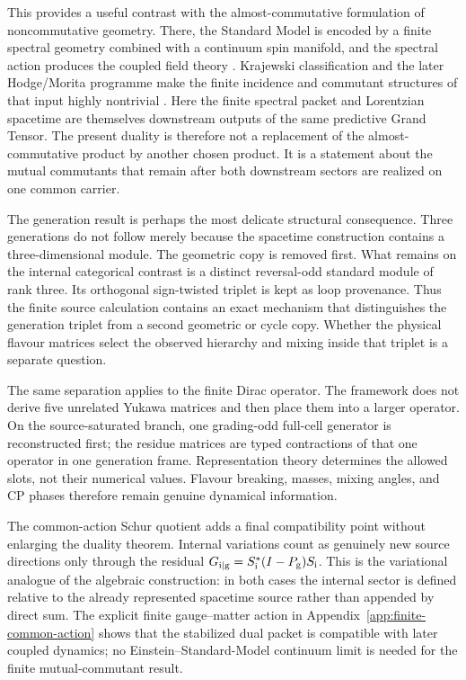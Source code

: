 \documentclass[11pt]{article}
\theoremstyle{definition}
\theoremstyle{remark}
\begin{document}
This provides a useful contrast with the almost-commutative formulation of
noncommutative geometry.  There, the Standard Model is encoded by a finite
spectral geometry combined with a continuum spin manifold, and the spectral
action produces the coupled field theory
\cite{ConnesGravityMatter1996,ChamseddineConnes1997,
ChamseddineConnesMarcolli2007,ChamseddineConnes2008,
vanDenDungenVanSuijlekom2012}.  Krajewski classification and the later
Hodge/Morita programme make the finite incidence and commutant structures of
that input highly nontrivial \cite{Krajewski1998,DAndreaDabrowski2016,
DabrowskiDAndreaSitarz2018}.  Here the finite spectral packet and Lorentzian
spacetime are themselves downstream outputs of the same predictive Grand
Tensor.  The present duality is therefore not a replacement of the
almost-commutative product by another chosen product.  It is a statement about
the mutual commutants that remain after both downstream sectors are realized
on one common carrier.

The generation result is perhaps the most delicate structural consequence.
Three generations do not follow merely because the spacetime construction
contains a three-dimensional module.  The geometric copy is removed first.
What remains on the internal categorical contrast is a distinct
reversal-odd standard module of rank three.  Its orthogonal sign-twisted
triplet is kept as loop provenance.  Thus the finite source calculation
contains an exact mechanism that distinguishes the generation triplet from a
second geometric or cycle copy.  Whether the physical flavour matrices select
the observed hierarchy and mixing inside that triplet is a separate question.

The same separation applies to the finite Dirac operator.  The framework does
not derive five unrelated Yukawa matrices and then place them into a larger
operator.  On the source-saturated branch, one grading-odd full-cell generator
is reconstructed first; the residue matrices are typed contractions of that
one operator in one generation frame.  Representation theory determines the
allowed slots, not their numerical values.  Flavour breaking, masses, mixing
angles, and CP phases therefore remain genuine dynamical information.

The common-action Schur quotient adds a final compatibility point without
enlarging the duality theorem.  Internal variations count as genuinely new
source directions only through the residual
$G_{{\rm i}\mid{\rm g}}=S_{\rm i}^*(I-P_{\rm g})S_{\rm i}$.  This is the
variational analogue of the algebraic construction: in both cases the internal
sector is defined relative to the already represented spacetime source rather
than appended by direct sum.  The explicit finite gauge--matter action in
Appendix~\ref{app:finite-common-action} shows that the stabilized dual packet is
compatible with later coupled dynamics; no Einstein--Standard-Model continuum
limit is needed for the finite mutual-commutant result.
\end{document}
